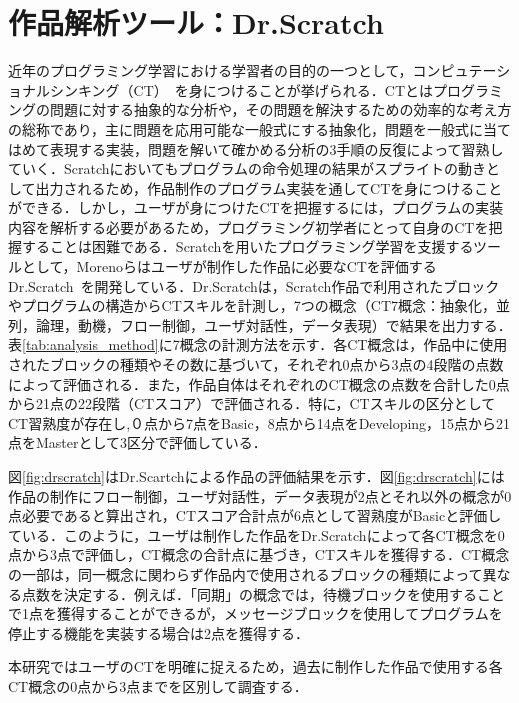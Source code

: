 \documentclass[11pt,dvipdfmx]{jreport}
\begin{document}
\section{作品解析ツール：Dr.Scratch}
近年のプログラミング学習における学習者の目的の一つとして，コンピュテーショナルシンキング（CT）~\cite{Wing_2006}を身につけることが挙げられる．CTとはプログラミングの問題に対する抽象的な分析や，その問題を解決するための効率的な考え方の総称であり，主に問題を応用可能な一般式にする抽象化，問題を一般式に当てはめて表現する実装，問題を解いて確かめる分析の3手順の反復によって習熟していく．Scratchにおいてもプログラムの命令処理の結果がスプライトの動きとして出力されるため，作品制作のプログラム実装を通してCTを身につけることができる．しかし，ユーザが身につけたCTを把握するには，プログラムの実装内容を解析する必要があるため，プログラミング初学者にとって自身のCTを把握することは困難である．Scratchを用いたプログラミング学習を支援するツールとして，Morenoらはユーザが制作した作品に必要なCTを評価するDr.Scratch~\cite{Moreno_2015}を開発している．Dr.Scratchは，Scratch作品で利用されたブロックやプログラムの構造からCTスキルを計測し，7つの概念（CT7概念：抽象化，並列，論理，動機，フロー制御，ユーザ対話性，データ表現）で結果を出力する．表\ref{tab:analysis_method}に7概念の計測方法を示す．各CT概念は，作品中に使用されたブロックの種類やその数に基づいて，それぞれ0点から3点の4段階の点数によって評価される．また，作品自体はそれぞれのCT概念の点数を合計した0点から21点の22段階（CTスコア）で評価される．特に，CTスキルの区分としてCT習熟度が存在し,０点から7点をBasic，8点から14点をDeveloping，15点から21点をMasterとして3区分で評価している．

図\ref{fig:drscratch}はDr.Scartchによる作品の評価結果を示す．図\ref{fig:drscratch}には作品の制作にフロー制御，ユーザ対話性，データ表現が2点とそれ以外の概念が0点必要であると算出され，CTスコア合計点が6点として習熟度がBasicと評価している．このように，ユーザは制作した作品をDr.Scratchによって各CT概念を0点から3点で評価し，CT概念の合計点に基づき，CTスキルを獲得する．CT概念の一部は，同一概念に関わらず作品内で使用されるブロックの種類によって異なる点数を決定する．例えば．「同期」の概念では，待機ブロックを使用することで1点を獲得することができるが，メッセージブロックを使用してプログラムを停止する機能を実装する場合は2点を獲得する．

本研究ではユーザのCTを明確に捉えるため，過去に制作した作品で使用する各CT概念の0点から3点までを区別して調査する．
\end{document}

